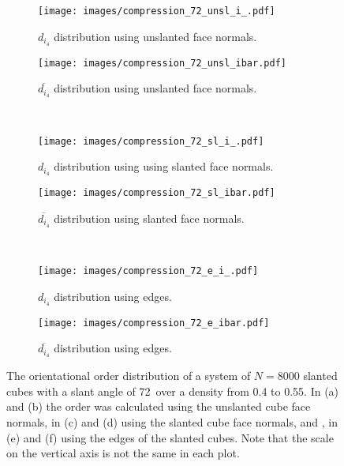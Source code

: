 \documentclass[thesis]{subfiles}
\begin{document}
\begin{figure}[H]
	\centering
	\begin{subfigure}{0.48\textwidth}
		\centering
		\texttt{[image: images/compression\_72\_unsl\_i\_.pdf]}
		\caption{$d_{i_4}$ distribution using unslanted face normals.}\label{fig:orient_comparison_unsl1}
	\end{subfigure}
	\begin{subfigure}{0.51\textwidth}
		\centering
		\texttt{[image: images/compression\_72\_unsl\_ibar.pdf]}
		\caption{$\overline{d_{i_4}}$ distribution using unslanted face normals.}\label{fig:orient_comparison_unsl2}
	\end{subfigure}\\\vspace{10pt}
	\begin{subfigure}{0.48\textwidth}
		\centering
		\texttt{[image: images/compression\_72\_sl\_i\_.pdf]}
		\caption{$d_{i_4}$ distribution using using slanted face normals.}\label{fig:orient_comparison_sl1}
	\end{subfigure}
	\begin{subfigure}{0.51\textwidth}
		\centering
		\texttt{[image: images/compression\_72\_sl\_ibar.pdf]}
		\caption{$\overline{d_{i_4}}$ distribution using slanted face normals.}\label{fig:orient_comparison_sl2}
	\end{subfigure}\\\vspace{10pt}
	\begin{subfigure}{0.48\textwidth}
		\centering
		\texttt{[image: images/compression\_72\_e\_i\_.pdf]}
		\caption{$d_{i_4}$ distribution using edges.}\label{fig:orient_comparison_e1}
	\end{subfigure}
	\begin{subfigure}{0.51\textwidth}
		\centering
		\texttt{[image: images/compression\_72\_e\_ibar.pdf]}
		\caption{$\overline{d_{i_4}}$ distribution using edges.}\label{fig:orient_comparison_e2}
	\end{subfigure}
	\caption{The orientational order distribution of a system of $N = 8000$ slanted cubes with a slant angle of 72\degr\ over a density from 0.4 to 0.55. In (a) and (b) the order was calculated using the unslanted cube face normals, in (c) and (d) using the slanted cube face normals, and , in (e) and (f) using the edges of the slanted cubes. Note that the scale on the vertical axis is not the same in each plot.}
	\label{fig:orient_comparison}
\end{figure}
\end{document}
